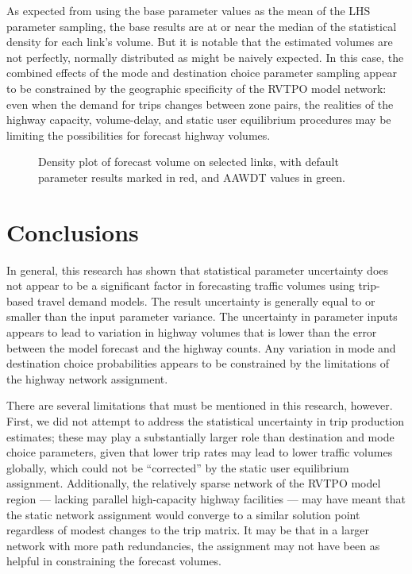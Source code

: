 \documentclass[
  futuretransp,
  submit,
  moreauthors,
]{Definitions/mdpi}
\begin{document}
As expected from using the base parameter values as the mean of the LHS
parameter sampling, the base results are at or near the median of the
statistical density for each link's volume. But it is notable that the
estimated volumes are not perfectly, normally distributed as might be
naively expected. In this case, the combined effects of the mode and
destination choice parameter sampling appear to be constrained by the
geographic specificity of the RVTPO model network: even when the demand
for trips changes between zone pairs, the realities of the highway
capacity, volume-delay, and static user equilibrium procedures may be
limiting the possibilities for forecast highway volumes.

\begin{figure}


\caption{\label{fig-densityplots}Density plot of forecast volume on
selected links, with default parameter results marked in red, and AAWDT
values in green.}

\end{figure}%


\section{Conclusions}\label{sec-conclusions}

In general, this research has shown that statistical parameter
uncertainty does not appear to be a significant factor in forecasting
traffic volumes using trip-based travel demand models. The result
uncertainty is generally equal to or smaller than the input parameter
variance. The uncertainty in parameter inputs appears to lead to
variation in highway volumes that is lower than the error between the
model forecast and the highway counts. Any variation in mode and
destination choice probabilities appears to be constrained by the
limitations of the highway network assignment.

There are several limitations that must be mentioned in this research,
however. First, we did not attempt to address the statistical
uncertainty in trip production estimates; these may play a substantially
larger role than destination and mode choice parameters, given that
lower trip rates may lead to lower traffic volumes globally, which could
not be ``corrected'' by the static user equilibrium assignment.
Additionally, the relatively sparse network of the RVTPO model region
--- lacking parallel high-capacity highway facilities --- may have meant
that the static network assignment would converge to a similar solution
point regardless of modest changes to the trip matrix. It may be that in
a larger network with more path redundancies, the assignment may not
have been as helpful in constraining the forecast volumes.
\end{document}

